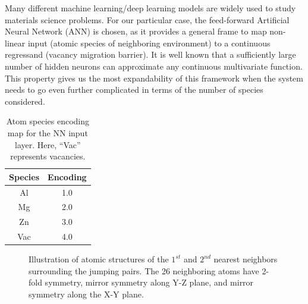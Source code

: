 Many different machine learning/deep learning models are widely used to study materials science problems\cite{bartok2010gaussian,behler2011atom,szlachta2014accuracy,artrith2016implementation,mehta2014exact,artrith2017efficient}. For our particular case, the feed-forward Artificial Neural Network (ANN) is chosen, as it provides a general frame to map non-linear input (atomic species of neighboring environment) to a continuous regressand (vacancy migration barrier). It is well known that a sufficiently large number of hidden neurons can approximate any continuous multivariate function\cite{hornik1989multilayer}. This property gives us the most expandability of this framework when the system needs to go even further complicated in terms of the number of species considered. 

\begin{table}[!htbp]
\centering
\caption[Atom species encoding map for the \acf{NN} input layer.]{Atom species encoding map for the \acf{NN} input layer. Here, ``Vac'' represents vacancies.}
\label{Chap:Al/Vac:tab:mapping}
\begin{tabular}{cc}
\\
\hline
\hline
Species & Encoding  \\ \hline
Al & 1.0 \\
Mg & 2.0 \\
Zn & 3.0 \\
Vac & 4.0 \\
\hline
\hline
\end{tabular}
\end{table}

\begingroup
\begin{figure}[!ht]
  \centering
\caption[Illustration of atomic structures of the $\text{1}^{st}$ and $\text{2}^{nd}$ nearest neighbors surrounding the jumping pairs.]{Illustration of atomic structures of the $\text{1}^{st}$ and $\text{2}^{nd}$ nearest neighbors surrounding the jumping pairs. The 26 neighboring atoms have 2-fold symmetry, mirror symmetry along Y-Z plane, and mirror symmetry along the X-Y plane.}
\label{Chap:Al/Vac:fig:2nn}
\end{figure}
\endgroup

